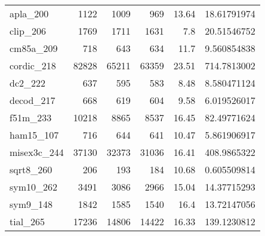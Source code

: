 \begin{table}[tbp]
\begin{tabular}{l|r|r|r|r|r}
      apla\_200                      &1122                      &1009                       &969                        &13.64                               &18.61791974                             \\
      clip\_206                      &1769                      &1711                       &1631                       &7.8                                 &20.51546752                             \\
      cm85a\_209                     &718                       &643                        &634                        &11.7                                &9.560854838                             \\
      cordic\_218                    &82828                     &65211                      &63359                      &23.51                               &714.7813002                             \\
      dc2\_222                       &637                       &595                        &583                        &8.48                                &8.580471124                             \\
      decod\_217                     &668                       &619                        &604                        &9.58                                &6.019526017                             \\
      f51m\_233                      &10218                     &8865                       &8537                       &16.45                               &82.49771624                             \\
      ham15\_107                     &716                       &644                        &641                        &10.47                               &5.861906917                             \\
      misex3c\_244                   &37130                     &32373                      &31036                      &16.41                               &408.9865322                             \\
      sqrt8\_260                     &206                       &193                        &184                        &10.68                               &0.605509814                             \\
      sym10\_262                     &3491                      &3086                       &2966                       &15.04                               &14.37715293                             \\
      sym9\_148                      &1842                      &1585                       &1540                       &16.4                                &13.72147056                             \\
      tial\_265                      &17236                     &14806                      &14422                      &16.33                               &139.1230812                             \\ \hline
  \end{tabular}
\end{table}

